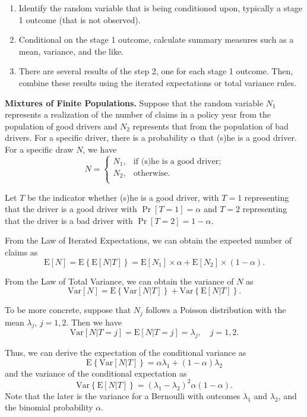 \documentclass[]{book}
\theoremstyle{definition}
\theoremstyle{definition}
\theoremstyle{definition}
\theoremstyle{remark}
\begin{document}
\begin{enumerate}
\def\labelenumi{\arabic{enumi}.}
\item
  Identify the random variable that is being conditioned upon, typically
  a stage 1 outcome (that is not observed).
\item
  Conditional on the stage 1 outcome, calculate summary measures such as
  a mean, variance, and the like.
\item
  There are several results of the step 2, one for each stage 1 outcome.
  Then, combine these results using the iterated expectations or total
  variance rules.
\end{enumerate}

\textbf{Mixtures of Finite Populations.} Suppose that the random
variable \(N_1\) represents a realization of the number of claims in a
policy year from the population of good drivers and \(N_2\) represents
that from the population of bad drivers. For a specific driver, there is
a probability \(\alpha\) that (s)he is a good driver. For a specific
draw \(N\), we have \[N =
    \begin{cases}
    N_1,  &  \text{if (s)he is a good driver;}\\
    N_2,  &   \text{otherwise}.\\
    \end{cases}\]

Let \(T\) be the indicator whether (s)he is a good driver, with \(T=1\)
representing that the driver is a good driver with \(\Pr[T=1]=\alpha\)
and \(T=2\) representing that the driver is a bad driver with
\(\Pr[T=2]=1-\alpha\).

From the Law of Iterated Expectations, we can obtain the expected number
of claims as \[
    \mathrm{E}[N]= \mathrm{E} \left\{ \mathrm{E} \left[ N | T \right] \right \}= \mathrm{E}[N_1] \times \alpha +  \mathrm{E}[N_2] \times (1-\alpha).\]

From the Law of Total Variance, we can obtain the variance of \(N\) as
\[\mathrm{Var}[N]= \mathrm{E} \left\{ \mathrm{Var} \left[ N | T \right] \right \}
    +\mathrm{Var} \left\{ \mathrm{E} \left[ N | T \right] \right \}.\]

To be more concrete, suppose that \(N_j\) follows a Poisson distribution
with the mean \(\lambda_j\), \(j=1,2\). Then we have
\[\mathrm{Var}[N|T=j]= \mathrm{E}[N|T=j] = \lambda_j, \quad j = 1,2.\]

Thus, we can derive the expectation of the conditional variance as
\[\mathrm{E} \left\{ \mathrm{Var} \left[ N | T \right] \right \} = \alpha \lambda_1+ (1-\alpha) \lambda_2\]
and the variance of the conditional expectation as
\[\mathrm{Var} \left\{ \mathrm{E} \left[ N | T \right] \right \} = (\lambda_1-\lambda_2)^2 \alpha (1-\alpha).\]
Note that the later is the variance for a Bernoulli with outcomes
\(\lambda_1\) and \(\lambda_2\), and the binomial probability
\(\alpha\).
\end{document}
